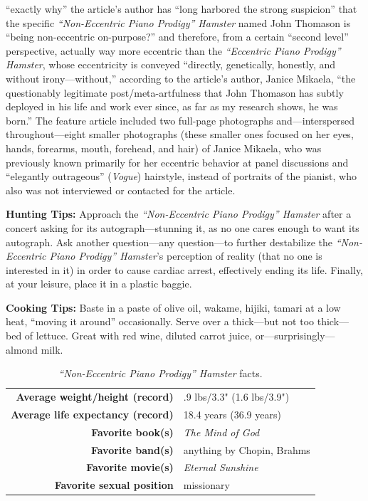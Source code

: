 \documentclass[10pt,twoside,openright]{memoir}
\begin{document}
``exactly
why'' the article's author has ``long harbored the strong
suspicion'' that the specific {\em ``Non-Eccentric Piano Prodigy'' Hamster}
named John Thomason is ``being non-eccentric on-purpose?'' and therefore,
from a certain ``second level'' perspective, actually way more eccentric
than the {\em ``Eccentric Piano Prodigy'' Hamster}, whose eccentricity is
conveyed ``directly, genetically, honestly, and without
irony---without,'' according to the article's author, Janice Mikaela,
``the questionably legitimate post/meta-artfulness that John Thomason has
subtly deployed in his life and work ever since, as far as my research shows, he
was born.'' The feature article included two full-page photographs
and---interspersed throughout---eight smaller photographs (these smaller
ones focused on her eyes, hands, forearms, mouth, forehead, and hair) of Janice
Mikaela, who was previously known primarily for her eccentric behavior at panel
discussions and ``elegantly outrageous'' ({\em Vogue}) hairstyle, instead of
portraits of the pianist, who also was not interviewed or contacted for the
article.

\vspace{2em}

\noindent
\textbf{Hunting Tips:} Approach the {\em ``Non-Eccentric Piano Prodigy''
Hamster} after a concert asking for its autograph---stunning it, as no one 
cares enough to want its autograph. Ask another question---any question---to 
further destabilize the {\em ``Non-Eccentric Piano Prodigy'' Hamster}'s 
perception of reality (that no one is interested in it) in order to cause 
cardiac arrest, effectively ending its life. Finally, at your leisure, place 
it in a plastic baggie. \\

\newpage

\noindent
\textbf{Cooking Tips:} Baste in a paste of olive oil, wakame, hijiki, tamari 
at a low heat, ``moving it around'' occasionally. Serve over a thick---but not
 too thick---bed of lettuce. Great with red wine, diluted carrot juice,
 or---surprisingly---almond milk.


\begin{table}
\begin{center}
  \small
  \begin{tabular}{rl}
  \textbf{Average weight/height (record)} & .9 lbs/3.3" (1.6 lbs/3.9") \\
  \textbf{Average life expectancy (record)} & 18.4 years (36.9 years) \\
  \textbf{Favorite book(s)} & {\em The Mind of God} \\
  \textbf{Favorite band(s)} & anything by Chopin, Brahms \\
  \textbf{Favorite movie(s)} & {\em Eternal Sunshine}  \\
  \textbf{Favorite sexual position} & missionary \\
  \end{tabular}
\end{center}
\caption*{{\em``Non-Eccentric Piano Prodigy'' Hamster} facts.}
\end{table}
\end{document}
